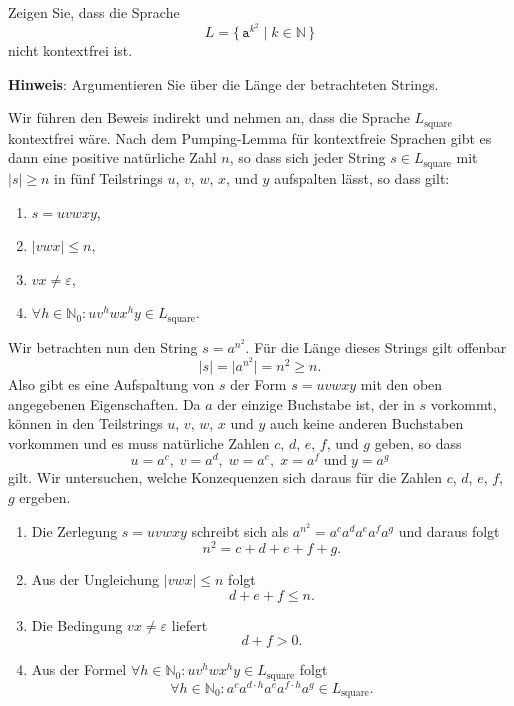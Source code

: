 \exercise
Zeigen Sie, dass die Sprache 
\[ L = \bigl\{ \,\mathtt{a}^{k^2} \;\big|\; k \in \mathbb{N}\, \bigr\} \]
nicht kontextfrei ist. 
\vspace*{0.2cm}

\noindent
\textbf{Hinweis}: Argumentieren Sie \"uber die L\"ange der betrachteten Strings. \eox
\vspace*{0.2cm}

\solution
Wir f\"uhren den Beweis indirekt und nehmen an, dass die Sprache $L_{\mathrm{square}}$ kontextfrei
w\"are.  Nach dem Pumping-Lemma f\"ur kontextfreie Sprachen gibt es dann eine positive
nat\"urliche Zahl $n$, so dass sich jeder String $s \in L_{\mathrm{square}}$ mit $|s| \geq n$ in f\"unf 
Teilstrings $u$, $v$, $w$, $x$, und $y$ aufspalten l\"asst, so dass gilt:
\begin{enumerate}
\item $s = uvwxy$,
\item $|vwx| \leq n$,
\item $vx \not= \varepsilon$,
\item $\forall h \in \mathbb{N}_0: uv^hwx^hy \in L_{\mathrm{square}}$. 
\end{enumerate} 
Wir betrachten nun den String $s = a^{n^2}$.  F\"ur die L\"ange dieses Strings gilt offenbar
\[ |s| = \big| a^{n^2} \big| = n^2 \geq n. \]
Also gibt es eine Aufspaltung von $s$ der Form $s = uvwxy$ mit den oben angegebenen Eigenschaften.
Da $a$ der einzige Buchstabe ist, der in $s$ vorkommt, k\"onnen in den Teilstrings $u$, $v$, $w$, $x$ und $y$
auch keine anderen Buchstaben vorkommen und es muss nat\"urliche Zahlen $c$, $d$, $e$, $f$, und $g$ geben, so
dass  
\[ u = a^c,\; v = a^d,\; w = a^e,\; x = a^f\; \mbox{und}\; y = a^g \]
gilt.  Wir untersuchen, welche Konzequenzen sich daraus f\"ur die Zahlen $c$, $d$, $e$, $f$, $g$ ergeben.
\begin{enumerate}
\item Die Zerlegung $s = uvwxy$ schreibt sich als $a^{n^2} = a^ca^da^ea^fa^g$ und daraus folgt
      \begin{equation}
        \label{eq:f1}
         n^2 = c + d + e + f + g.     
      \end{equation}
\item Aus der Ungleichung $|vwx| \leq n$ folgt  
      \begin{equation}
        \label{eq:f2}
        d + e + f \leq n.
      \end{equation}
\item Die Bedingung $vx \not= \varepsilon$ liefert
      \begin{equation}
        \label{eq:f3}
        d + f > 0.
      \end{equation}
\item Aus der Formel $\forall h \in \mathbb{N}_0: uv^hwx^hy \in L_{\mathrm{square}}$ folgt
      \begin{equation}
        \label{eq:f4}
        \forall h \in \mathbb{N}_0: a^ca^{d\cdot h}a^ea^{f\cdot h}a^g \in L_{\mathrm{square}}. 
      \end{equation}
\end{enumerate}
